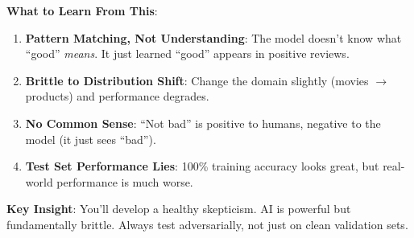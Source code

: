 \textbf{What to Learn From This}:

\begin{enumerate}
\item \textbf{Pattern Matching, Not Understanding}: The model doesn't know what ``good'' \textit{means}. It just learned ``good'' appears in positive reviews.

\item \textbf{Brittle to Distribution Shift}: Change the domain slightly (movies \(\rightarrow\) products) and performance degrades.

\item \textbf{No Common Sense}: ``Not bad'' is positive to humans, negative to the model (it just sees ``bad'').

\item \textbf{Test Set Performance Lies}: 100\% training accuracy looks great, but real-world performance is much worse.
\end{enumerate}

\textbf{Key Insight}: You'll develop a healthy skepticism. AI is powerful but fundamentally brittle. Always test adversarially, not just on clean validation sets.
